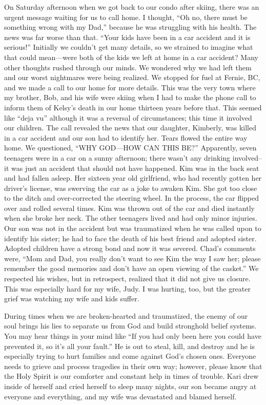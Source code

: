 \documentclass[twoside, 12pt]{book}
\begin{document}
On Saturday afternoon when we got back to our condo after skiing, there was an urgent message waiting for us to call home. I thought, “Oh no, there must be something wrong with my Dad,” because he was struggling with his health. The news was far worse than that. “Your kids have been in a car accident and it is serious!” Initially we couldn't get many details, so we strained to imagine what that could mean—were both of the kids we left at home in a car accident? Many other thoughts rushed through our minds. We wondered why we had left them and our worst nightmares were being realized. We stopped for fuel at Fernie, BC, and we made a call to our home for more details. This was the very town where my brother, Bob, and his wife were skiing when I had to make the phone call to inform them of Kelsy’s death in our home thirteen years before that. This seemed like “deja vu” although it was a reversal of circumstances; this time it involved our children. The call revealed the news that our daughter, Kimberly, was killed in a car accident and our son had to identify her. Tears flowed the entire way home. We questioned, “WHY GOD—HOW CAN THIS BE?” Apparently, seven teenagers were in a car on a sunny afternoon; there wasn’t any drinking involved--it was just an accident that should not have happened. Kim was in the back seat and had fallen asleep. Her sixteen year old girlfriend, who had recently gotten her driver’s license, was swerving the car as a joke to awaken Kim. She got too close to the ditch and over-corrected the steering wheel. In the process, the car flipped over and rolled several times. Kim was thrown out of the car and died instantly when she broke her neck. The other teenagers lived and had only minor injuries. Our son was not in the accident but was traumatized when he was called upon to identify his sister; he had to face the death of his best friend and adopted sister. Adopted children have a strong bond and now it was severed. Chad's comments were, “Mom and Dad, you really don't want to see Kim the way I saw her; please remember the good memories and don't have an open viewing of the casket.” We respected his wishes, but in retrospect, realized that it did not give us closure. This was especially hard for my wife, Judy.  I was hurting, too, but the greater grief was watching my wife and kids suffer.

During times when we are broken-hearted and traumatized, the enemy of our soul brings his lies to separate us from God and build stronghold belief systems. You may hear things in your mind like “If you had only been here you could have prevented it, so it's all your fault.” He is out to steal, kill, and destroy and he is especially trying to hurt families and come against God's chosen ones. Everyone needs to grieve and process tragedies in their own way; however, please know that the Holy Spirit is our comforter and constant help in times of trouble. Kari drew inside of herself and cried herself to sleep many nights, our son became angry at everyone and everything, and my wife was devastated and blamed herself.
\end{document}
